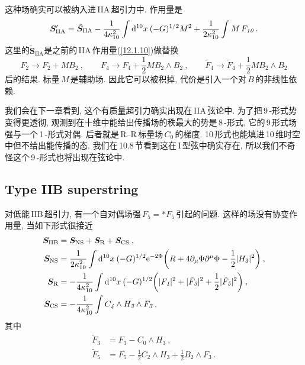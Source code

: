 这种场确实可以被纳入进\,IIA\,超引力中. 作用量是
\begin{equation}
    \bm{S}_{\text{IIA}}^{\prime}=\tilde{\bm{S}}_{\text{IIA}}-\frac{1}{4\kappa_{10}^{2}}\int\mathrm{d}^{10}x\: (-G)^{1/2}M^{2}+\frac{1}{2\kappa_{10}^{2}}\int M\,F_{\textit{10}}\:. \label{12.1.24}
\end{equation}
这里的$\tilde{\bm{S}}_{\text{IIA}}$是之前的\,IIA\,作用量(\ref{12.1.10})做替换
\begin{equation}
    F_{\textit{2}}\to F_{\textit{2}}+MB_{\textit{2}}\:, \qquad 
    F_{\textit{4}}\to F_{\textit{4}}+\frac{1}{2}MB_{\textit{2}}\wedge B_{\textit{2}}\:,\qquad \tilde{F}_{\textit{4}}\to\tilde{F}_{\textit{4}}+\frac{1}{2}MB_{\textit{2}}\wedge B_\textit{2} \label{12.1.25}
\end{equation}
后的结果. 标量$\,M\,$是辅助场. 因此它可以被积掉, 代价是引入一个对$\,B\,$的非线性依赖.

我们会在下一章看到, 这个有质量超引力确实出现在\,IIA\,弦论中. 为了把\,9\,-形式势变得更透彻, 观测到在十维中能给出传播场的秩最大的势是\,8\,-形式, 它的\,9\,形式场强与一个\,1\,-形式对偶. 后者就是\,R--R\,标量场$\,C_{\textit{0}}\,$的梯度. 10\,形式也能填进\,10\,维时空中但不给出能传播的态. 我们在\,10.8\,节看到这在\,I\,型弦中确实存在, 所以我们不奇怪这个\,9\,-形式也将出现在弦论中.


\subsection*{Type IIB superstring}
 
对低能\,IIB\,超引力, 有一个自对偶场强$\,F_{\textit{5}}=\ast F_{\textit{5}}\,$引起的问题. 这样的场没有协变作用量, 当如下形式很接近
\begin{subequations}
\begin{align}
    \bm{S}_{\text{IIB}}&=\bm{S}_{\text{NS}}+\bm{S}_{\text{R}}+\bm{S}_{\text{CS}} \:, \label{12.1.26a} \\
    \bm{S}_{\text{NS}}&=\frac{1}{2\kappa_{10}^{2}}\int\mathrm{d}^{10}x\:(-G)^{1/2}\mathrm{e}^{-2\Phi}
    \biggl(R+4\partial_{\mu}\Phi\partial^{\mu}\Phi-\frac{1}{2}\lvert H_{3}\rvert^{2}\biggr) \:,\label{12.1.26b} \\
    \bm{S}_{\text{R}}&=- \frac{1}{4\kappa_{10}^{2}} \int \mathrm{d}^{10}x\:(-G)^{1/2}\biggl(\lvert F_{\textit{1}}\rvert^{2}+\lvert\tilde{F}_{\textit{3}}\rvert^{2}+\frac{1}{2}\lvert\tilde{F}_{\textit{5}}\rvert^{2}\biggr) \:, \label{12.1.26c} \\
    \bm{S}_{\text{CS}}&=-\frac{1}{4\kappa_{10}^{2}}\int C_{\textit{4}}\wedge H_{\textit{3}}\wedge F_{\textit{3}} \:,
\end{align}
\end{subequations}
其中
\begin{subequations}
\begin{align}
    \tilde{F}_{\textit{3}} &= F_{\textit{3}}- C_{\textit{0}}\wedge H_{\textit{3}} \:, \label{12.1.27a}\\
    \tilde{F}_{\textit{5}} &= F_{\textit{5}} -\frac{1}{2}C_{\textit{2}}\wedge H_{\textit{3}} +\frac{1}{2}B_{\textit{2}}\wedge F_{\textit{3}} \:. \label{12.1.27b}
\end{align}
\end{subequations}



